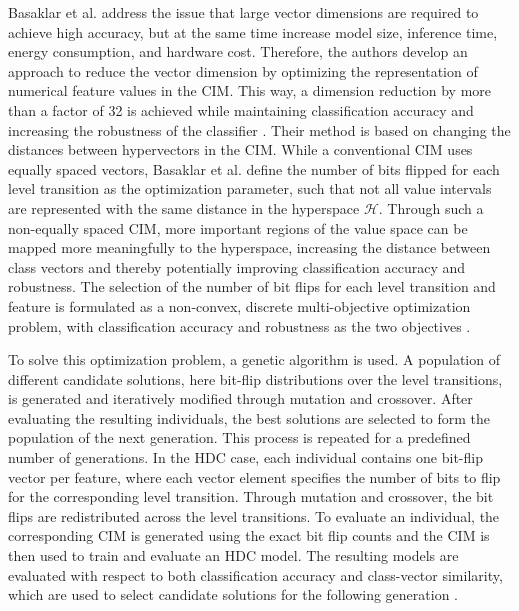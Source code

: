     Basaklar et al. \cite{basaklar_hypervector_2021} address the issue that large vector dimensions are required to achieve high accuracy, but at the same time increase model size, inference time, energy consumption, and hardware cost. Therefore, the authors develop an approach to reduce the vector dimension by optimizing the representation of numerical feature values in the \ac{CIM}. This way, a dimension reduction by more than a factor of 32 is achieved while maintaining classification accuracy and increasing the robustness of the classifier \cite{basaklar_hypervector_2021}.
    Their method is based on changing the distances between hypervectors in the \ac{CIM}. While a conventional \ac{CIM} uses equally spaced vectors, Basaklar et al. define the number of bits flipped for each level transition as the optimization parameter, such that not all value intervals are represented with the same distance in the hyperspace $\mathcal{H}$. Through such a non-equally spaced \ac{CIM}, more important regions of the value space can be mapped more meaningfully to the hyperspace, increasing the distance between class vectors and thereby potentially improving classification accuracy and robustness. The selection of the number of bit flips for each level transition and feature is formulated as a non-convex, discrete multi-objective optimization problem, with classification accuracy and robustness as the two objectives \cite{basaklar_hypervector_2021}.
    
    To solve this optimization problem, a genetic algorithm is used. A population of different candidate solutions, here bit-flip distributions over the level transitions, is generated and iteratively modified through mutation and crossover. After evaluating the resulting individuals, the best solutions are selected to form the population of the next generation. This process is repeated for a predefined number of generations. In the HDC case, each individual contains one bit-flip vector per feature, where each vector element specifies the number of bits to flip for the corresponding level transition. Through mutation and crossover, the bit flips are redistributed across the level transitions. To evaluate an individual, the corresponding CIM is generated using the exact bit flip counts and the CIM is then used to train and evaluate an HDC model. The resulting models are evaluated with respect to both classification accuracy and class-vector similarity, which are used to select candidate solutions for the following generation \cite{basaklar_hypervector_2021}.
    
